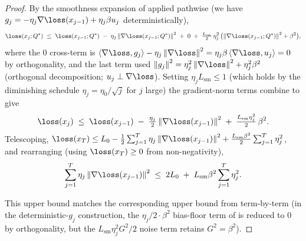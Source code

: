 \begin{proof}
By the smoothness expansion of  applied
pathwise (we have $g_j = -\eta_j \nabla \loss(x_{j-1}) + \eta_j \beta u_j$
deterministically),
\begin{align*}
   \loss(x_j; Q^*)
   \;\le\;
   \loss(x_{j-1}; Q^*)
   \;-\; \eta_j \norm{\nabla \loss(x_{j-1}; Q^*)}^2
   \;+\; 0
   \;+\; \tfrac{L_{\mathrm{sm}}}{2}\, \eta_j^2\, \bigl(\norm{\nabla \loss(x_{j-1}; Q^*)}^2 + \beta^2\bigr),
\end{align*}
where the $0$ cross-term is $\inner{\nabla \loss}{g_j} - \eta_j \norm{\nabla \loss}^2 = \eta_j \beta \inner{\nabla \loss}{u_j} = 0$
by orthogonality, and the last term used $\norm{g_j}^2 = \eta_j^2 \norm{\nabla \loss}^2 + \eta_j^2 \beta^2$
(orthogonal decomposition; $u_j \perp \nabla \loss$). Setting
$\eta_j L_{\mathrm{sm}} \le 1$ (which holds by the diminishing schedule
$\eta_j = \eta_0 / \sqrt j$ for $j$ large) the gradient-norm terms
combine to give
\begin{align*}
   \loss(x_j) \;\le\; \loss(x_{j-1}) \;-\; \tfrac{\eta_j}{2} \norm{\nabla \loss(x_{j-1})}^2
   \;+\; \tfrac{L_{\mathrm{sm}} \eta_j^2}{2}\, \beta^2.
\end{align*}
Telescoping, $\loss(x_T) \le L_0 - \tfrac{1}{2} \sum_{j=1}^T \eta_j \norm{\nabla \loss(x_{j-1})}^2 + \tfrac{L_{\mathrm{sm}} \beta^2}{2} \sum_{j=1}^T \eta_j^2$,
and rearranging (using $\loss(x_T) \ge 0$ from non-negativity),
\begin{align}\label{eq:lower_bound_telescope}
   \sum_{j=1}^T \eta_j \norm{\nabla \loss(x_{j-1})}^2
   \;\le\; 2 L_0
   \;+\; L_{\mathrm{sm}} \beta^2 \sum_{j=1}^T \eta_j^2.
\end{align}

This upper bound matches the corresponding upper bound from
 term-by-term (in the deterministic-$g_j$
construction, the $\eta_j/2 \cdot \beta^2$ bias-floor term of
 is reduced to $0$ by orthogonality, but the
$L_{\mathrm{sm}} \eta_j^2 G^2 / 2$ noise term retains $G^2 = \beta^2$).


\end{proof}
